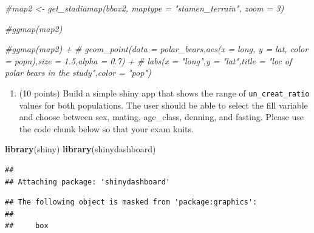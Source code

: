 \documentclass[
]{article}
\newenvironment{Shaded}{\begin{snugshade}}{\end{snugshade}}
\newcommand{\CommentTok}[1]{\textcolor[rgb]{0.56,0.35,0.01}{\textit{#1}}}
\newcommand{\FunctionTok}[1]{\textcolor[rgb]{0.13,0.29,0.53}{\textbf{#1}}}
\newcommand{\NormalTok}[1]{#1}
\providecommand{\tightlist}{%
  \setlength{\itemsep}{0pt}\setlength{\parskip}{0pt}}
\begin{document}
\begin{Shaded}
\begin{Highlighting}[]
\CommentTok{\#map2 \textless{}{-} get\_stadiamap(bbox2, maptype = "stamen\_terrain", zoom = 3)}
\end{Highlighting}
\end{Shaded}

\begin{Shaded}
\begin{Highlighting}[]
\CommentTok{\#ggmap(map2)}
\end{Highlighting}
\end{Shaded}

\begin{Shaded}
\begin{Highlighting}[]
\CommentTok{\#ggmap(map2) +}
\CommentTok{\#  geom\_point(data = polar\_bears,aes(x = long, y = lat, color = popn),size = 1.5,alpha = 0.7) +}
\CommentTok{\#  labs(x = "long",y = "lat",title = "loc of polar bears in the study",color = "pop")}
\end{Highlighting}
\end{Shaded}

\begin{enumerate}
\def\labelenumi{\arabic{enumi}.}
\setcounter{enumi}{9}
\tightlist
\item
  (10 points) Build a simple shiny app that shows the range of
  \texttt{un\_creat\_ratio} values for both populations. The user should
  be able to select the fill variable and choose between sex, mating,
  age\_class, denning, and fasting. Please use the code chunk below so
  that your exam knits.
\end{enumerate}

\begin{Shaded}
\begin{Highlighting}[]
\FunctionTok{library}\NormalTok{(shiny)}
\FunctionTok{library}\NormalTok{(shinydashboard)}
\end{Highlighting}
\end{Shaded}

\begin{verbatim}
## 
## Attaching package: 'shinydashboard'
\end{verbatim}

\begin{verbatim}
## The following object is masked from 'package:graphics':
## 
##     box
\end{verbatim}
\end{document}
